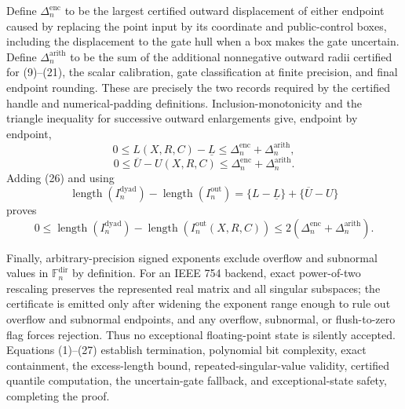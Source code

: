 Define \(\Delta_n^{\mathrm{enc}}\) to be the largest certified outward displacement of either endpoint caused by replacing the point input by its coordinate and public-control boxes, including the displacement to the gate hull when a box makes the gate uncertain. Define \(\Delta_n^{\mathrm{arith}}\) to be the sum of the additional nonnegative outward radii certified for (9)--(21), the scalar calibration, gate classification at finite precision, and final endpoint rounding. These are precisely the two records required by the certified handle and numerical-padding definitions. Inclusion-monotonicity and the triangle inequality for successive outward enlargements give, endpoint by endpoint,
\[
0\le L(X,R,C)-\underline L
\le\Delta_n^{\mathrm{enc}}+\Delta_n^{\mathrm{arith}},
\]
\[
0\le\overline U-U(X,R,C)
\le\Delta_n^{\mathrm{enc}}+\Delta_n^{\mathrm{arith}}.
\tag{26}
\]
Adding (26) and using
\[
\operatorname{length}(I_n^{\mathrm{dyad}})
-\operatorname{length}(I_n^{\mathrm{out}})
=\{L-\underline L\}+\{\overline U-U\}
\]
proves
\[
0\le
\operatorname{length}(I_n^{\mathrm{dyad}})
-\operatorname{length}(I_n^{\mathrm{out}}(X,R,C))
\le2(\Delta_n^{\mathrm{enc}}+\Delta_n^{\mathrm{arith}}).
\tag{27}
\]

Finally, arbitrary-precision signed exponents exclude overflow and subnormal values in \(\mathbb F_n^{\mathrm{dir}}\) by definition. For an IEEE 754 backend, exact power-of-two rescaling preserves the represented real matrix and all singular subspaces; the certificate is emitted only after widening the exponent range enough to rule out overflow and subnormal endpoints, and any overflow, subnormal, or flush-to-zero flag forces rejection. Thus no exceptional floating-point state is silently accepted. Equations (1)--(27) establish termination, polynomial bit complexity, exact containment, the excess-length bound, repeated-singular-value validity, certified quantile computation, the uncertain-gate fallback, and exceptional-state safety, completing the proof.
